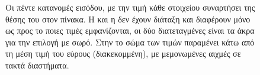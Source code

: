 \begin{figure}[H]
    \caption[Οι πέντε κατανομές εισόδου]{Οι πέντε κατανομές εισόδου, με την τιμή κάθε στοιχείου
    συναρτήσει της θέσης του στον πίνακα. Η  και η  δεν
    έχουν διάταξη και διαφέρουν μόνο ως προς το ποιες τιμές εμφανίζονται, οι δύο
    διατεταγμένες είναι τα άκρα για την επιλογή με σωρό. Στην  το
    σώμα των τιμών παραμένει κάτω από τη μέση τιμή του εύρους (διακεκομμένη), με
    μεμονωμένες αιχμές σε τακτά διαστήματα.}
    \label{fig:meth-dists}
\end{figure}
